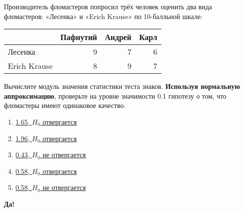 \documentclass[t]{beamer}
\begin{document}
 \begin{frame} \label{25-Yes} 
\begin{block}{25} 

  Производитель фломастеров попросил трёх человек оценить два вида фломастеров: «Лесенка» и «Erich Krause» по 10-балльной шкале:

\begin{center}
\begin{tabular}{lrrr} \toprule
 & Пафнутий  & Андрей & Карл \\
\midrule
Лесенка & 9 & 7 & 6 \\
Erich Krause & 8 & 9 & 7 \\
\bottomrule
\end{tabular}
\end{center}

Вычислите модуль значения статистики теста знаков. \textbf{Используя нормальную аппроксимацию}, проверьте на уровне значимости 0.1 гипотезу о том, что фломастеры имеют одинаковое качество.

  


 \end{block} 
\begin{enumerate} 
\item[] \hyperlink{25-No}{\beamergotobutton{} 1.65, $H_0$ отвергается}
\item[] \hyperlink{25-No}{\beamergotobutton{} 1.96, $H_0$ отвергается}
\item[] \hyperlink{25-No}{\beamergotobutton{} 0.43, $H_0$ не отвергается}
\item[] \hyperlink{25-No}{\beamergotobutton{} 0.58, $H_0$ отвергается}
\item[] \hyperlink{25-Yes}{\beamergotobutton{} 0.58, $H_0$ не отвергается}
\end{enumerate} 

 \textbf{Да!} 
 \hyperlink{26}{}\end{frame} 
\end{document}

